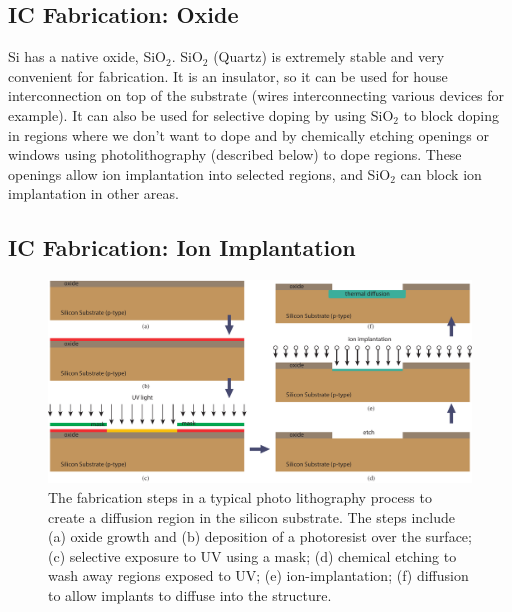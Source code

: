 \subsection{IC Fabrication: Oxide}
Si has a native oxide, SiO$_2$.  SiO$_2$ (Quartz) is extremely stable and very convenient for fabrication.   It is an insulator, so it can be used for house interconnection on top of the substrate (wires interconnecting various devices for example).   It can also be used for selective doping by using SiO$_2$ to block doping in regions where we don't want to dope and by chemically etching openings or windows  using photolithography (described below) to dope regions.   These openings allow ion implantation into selected regions, and 
 SiO$_2$ can block ion implantation in other areas.
\subsection{IC Fabrication: Ion Implantation}
\begin{figure}[tb]
\begin{center}
\includegraphics[width=\columnwidth]{process_steps}
\end{center}
\caption{The fabrication steps in a typical photo lithography process to create a diffusion region in the silicon substrate.  The steps include (a) oxide growth and (b) deposition of a photoresist over the surface; (c) selective exposure to UV using a mask; (d) chemical etching to wash away regions exposed to UV; (e) ion-implantation; (f) diffusion to allow implants to diffuse into the structure.} \label{fig:mod2-2_ICtech_sld_4}
\end{figure}

